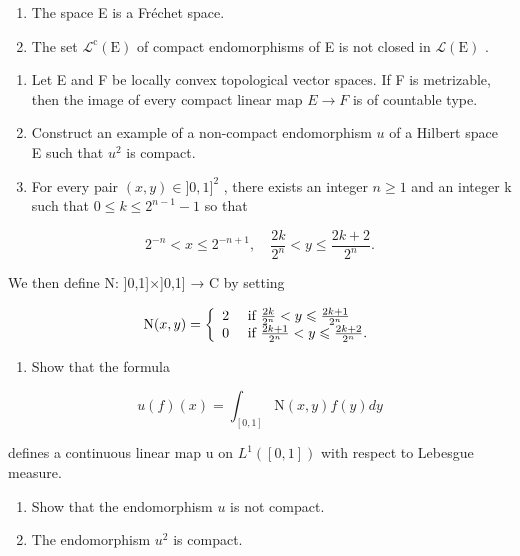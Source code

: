 \begin{enumerate}
\def\labelenumi{\alph{enumi})}
\item
  The space E is a Fréchet space.
\item
  The set \(\mathcal{L}^{\mathrm{c}}(\mathrm{E})\) of compact endomorphisms of E is not closed in \(\mathcal{L}(\mathrm{E})\) .
\end{enumerate}

\begin{enumerate}
\def\labelenumi{\arabic{enumi})}
\setcounter{enumi}{6}
\item
  Let E and F be locally convex topological vector spaces. If F is metrizable, then the image of every compact linear map \(E \rightarrow F\) is of countable type.
\item
  Construct an example of a non-compact endomorphism \(u\) of a Hilbert space E such that \(u^2\) is compact.
\item
  For every pair \((x,y)\in]0,1]^{2}\) , there exists an integer \(n\geqslant1\) and an integer k such that \(0\leqslant k\leqslant2^{n-1}-1\) so that
\end{enumerate}

\[
2 ^ {- n} <   x \leqslant 2 ^ {- n + 1}, \quad \frac {2 k}{2 ^ {n}} <   y \leqslant \frac {2 k + 2}{2 ^ {n}}.
\]

We then define N: ]0,1]×]0,1] → C by setting

\[
\mathrm{N} (x, y) = \left\{ \begin{array}{l l} 2 & \text { if } \frac {2 k}{2 ^ {n}} <   y \leqslant \frac {2 k + 1}{2 ^ {n}} \\ 0 & \text { if } \frac {2 k + 1}{2 ^ {n}} <   y \leqslant \frac {2 k + 2}{2 ^ {n}}. \end{array} \right.
\]

\begin{enumerate}
\def\labelenumi{\alph{enumi})}
\tightlist
\item
  Show that the formula
\end{enumerate}

\[
u (f) (x) = \int_ {[ 0, 1 ]} \mathrm{N} (x, y) f (y) d y
\]

defines a continuous linear map u on \(L^{1}([0,1])\) with respect to Lebesgue measure.

\begin{enumerate}
\def\labelenumi{\alph{enumi})}
\setcounter{enumi}{1}
\item
  Show that the endomorphism \(u\) is not compact.
\item
  The endomorphism \(u^2\) is compact.
\end{enumerate}

